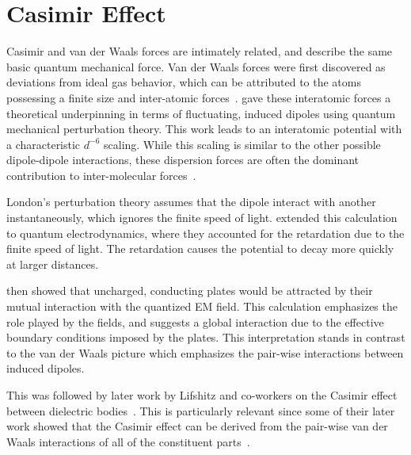 
\section{Casimir Effect}
\label{sec:casimir}
Casimir and van der Waals forces are intimately related, and describe the same basic quantum mechanical force. 
Van der Waals forces were first discovered as deviations from ideal gas behavior, which can be attributed 
to the atoms possessing a finite size and inter-atomic forces~\citep{vanderWaals,Parsegian2006}.
\citet{London1930} gave these interatomic forces a theoretical underpinning in terms of fluctuating,
 induced dipoles using quantum mechanical perturbation theory.
  This work leads to an interatomic potential with a characteristic $d^{-6}$ scaling.
While this scaling is similar to the other possible dipole-dipole interactions, 
these dispersion forces are often the dominant contribution to inter-molecular forces~\citep{Israelachvili2011}.

London's perturbation theory assumes that the dipole interact with another instantaneously, which
ignores the finite speed of light.  \citet{CasimirPolder1948} extended this calculation to quantum electrodynamics,
where they accounted for the retardation due to the finite speed of light. 
The retardation causes the potential to decay more quickly at larger distances.  

\citet{Casimir1948} then showed that uncharged, conducting plates would be attracted by their mutual
interaction with the quantized EM field.
This calculation emphasizes the role played by the fields, and suggests
a global interaction due to the effective boundary conditions imposed by the plates.
This interpretation stands in contrast to the van der Waals picture which emphasizes the pair-wise interactions between induced dipoles.

This was followed by later work by Lifshitz and co-workers on the Casimir effect between dielectric bodies~\citep{Lifshitz1956,Dzyaloshinskii1961}.
This is particularly relevant since some of their later work showed that the Casimir effect can be derived 
from the pair-wise van der Waals interactions of all of the constituent parts~\citep{Dzyaloshinskii1961}.  

